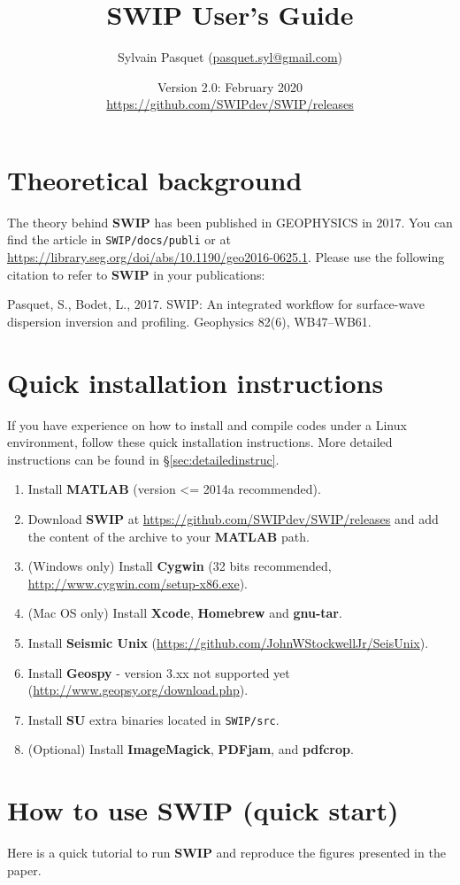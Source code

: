 \documentclass[twoside,a4paper]{article}
\title{\vspace{5cm}\Huge{\textbf{SWIP User's Guide}}}
\author{\Large{Sylvain Pasquet} (\url{pasquet.syl@gmail.com})}
\date{\LARGE{Version 2.0: February 2020}\\[2ex]
\large\url{https://github.com/SWIPdev/SWIP/releases}}
\def\SWIP{\textbf{SWIP}}
\def\SU{\textbf{SU}}
\def\SeismicUnix{\textbf{Seismic Unix}}
\def\Geopsy{\textbf{Geospy}}
\def\ImageMagick{\textbf{ImageMagick}}
\def\PDFjam{\textbf{PDFjam}}
\def\pdfcrop{\textbf{pdfcrop}}
\def\MATLAB{\textbf{MATLAB}}
\def\Cygwin{\textbf{Cygwin}}
\begin{document}
\maketitle
\thispagestyle{empty}
\newpage
\tableofcontents

\newpage
\section{Theoretical background}
The theory behind {\SWIP} has been published in GEOPHYSICS in 2017. You can find the article in \verb|SWIP/docs/publi| or at \url{https://library.seg.org/doi/abs/10.1190/geo2016-0625.1}. Please use the following citation to refer to {\SWIP} in your publications:

Pasquet, S., Bodet, L., 2017. SWIP: An integrated workflow for surface-wave dispersion inversion and profiling. Geophysics 82(6), WB47–WB61.

\section{Quick installation instructions}
If you have experience on how to install and compile codes under a Linux environment, follow these quick installation instructions. More detailed instructions can be found in §\ref{sec:detailedinstruc}.
\begin{enumerate}[leftmargin=*]
\setlength\itemsep{2ex}
\item Install {\MATLAB} (version <= 2014a recommended).
\item Download {\SWIP} at \url{https://github.com/SWIPdev/SWIP/releases} and add the content of the archive to your {\MATLAB} path.
\item (Windows only) Install {\Cygwin} (32 bits recommended, \url{http://www.cygwin.com/setup-x86.exe}).
\item (Mac OS only) Install \textbf{Xcode}, \textbf{Homebrew} and \textbf{gnu-tar}.
\item Install {\SeismicUnix} (\url{https://github.com/JohnWStockwellJr/SeisUnix}).
\item Install {\Geopsy} - version 3.xx not supported yet (\url{http://www.geopsy.org/download.php}).
\item Install {\SU} extra binaries located in \verb|SWIP/src|.
\item (Optional) Install {\ImageMagick}, {\PDFjam}, and {\pdfcrop}.
\end{enumerate}

\section{How to use SWIP (quick start)}
Here is a quick tutorial to run {\SWIP} and reproduce the figures presented in the paper.
\end{document}
